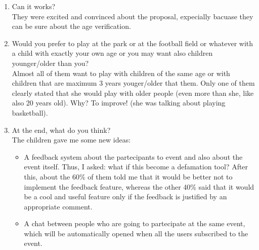 \documentclass[12pt]{article}
\begin{document}
\begin{enumerate}
  \item Can it works? \\
  They were excited and convinced about the proposal, expecially bacuase they can be sure about the age verification. \\
  \item Would you prefer to play at the park or at the football field or whatever with a child with exactly your own age or you may want also children younger/older than you? \\
  Almost all of them want to play with children of the same age or with children that are maximum 3 years youger/older that them.
  Only one of them clearly stated that she would play with older people (even more than she, like also 20 years old). Why? To improve! (she was talking about playing basketball). \\
  \item At the end, what do you think? \\
  The children gave me some new ideas:
  \begin{itemize}
    \item A feedback system about the partecipants to event and also about the event itself. Thus, I asked: what if this become a defamation tool? After this, about the 60\% of them told me that it would be better not to implement the feedback feature,
    whereas the other 40\% said that it would be a cool and useful feature only if the feedback is justified by an appropriate comment.
    \item A chat between people who are going to partecipate at the same event, which will be automatically opened when all the users subscribed to the event.
  \end{itemize}
\end{enumerate}
\end{document}
